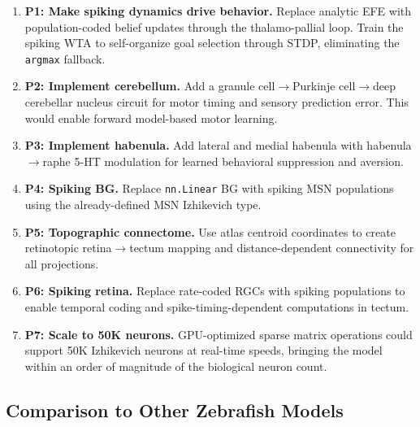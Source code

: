 \documentclass[11pt,a4paper]{article}
\begin{document}
\begin{enumerate}[leftmargin=*]
\item \textbf{P1: Make spiking dynamics drive behavior.}
  Replace analytic EFE with population-coded belief updates through the
  thalamo-pallial loop.  Train the spiking WTA to self-organize goal
  selection through STDP, eliminating the \texttt{argmax} fallback.

\item \textbf{P2: Implement cerebellum.}
  Add a granule cell$\to$Purkinje cell$\to$deep cerebellar nucleus circuit
  for motor timing and sensory prediction error.  This would enable
  forward model-based motor learning.

\item \textbf{P3: Implement habenula.}
  Add lateral and medial habenula with habenula$\to$raphe 5-HT modulation
  for learned behavioral suppression and aversion.

\item \textbf{P4: Spiking BG.}
  Replace \texttt{nn.Linear} BG with spiking MSN populations using the
  already-defined MSN Izhikevich type.

\item \textbf{P5: Topographic connectome.}
  Use atlas centroid coordinates to create retinotopic retina$\to$tectum
  mapping and distance-dependent connectivity for all projections.

\item \textbf{P6: Spiking retina.}
  Replace rate-coded RGCs with spiking populations to enable temporal
  coding and spike-timing-dependent computations in tectum.

\item \textbf{P7: Scale to 50K neurons.}
  GPU-optimized sparse matrix operations could support 50K Izhikevich
  neurons at real-time speeds, bringing the model within an order of
  magnitude of the biological neuron count.
\end{enumerate}

\subsection{Comparison to Other Zebrafish Models}
\end{document}
